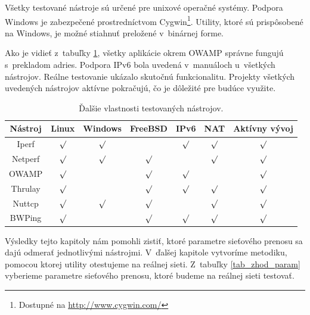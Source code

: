 \newpage 

    Všetky testované nástroje sú určené pre unixové operačné systémy.
    Podpora Windows je zabezpečené
    prostredníctvom Cygwin\footnote{Dostupné na \url{http://www.cygwin.com/}}.
    Utility, ktoré sú prispôsobené na Windows, je možné
    stiahnuť preložené v~binárnej forme. 
    
    Ako je vidieť z~tabuľky
    \ref{tab_zhod_vlast}, všetky aplikácie okrem OWAMP správne fungujú s~prekladom adries. 
    Podpora IPv6 bola uvedená v~manuáloch u~všetkých nástrojov. Reálne 
    testovanie ukázalo skutočnú funkcionalitu. Projekty všetkých uvedených
    nástrojov aktívne pokračujú, čo je dôležité pre budúce využite.

    \begin{table}[h!]
        \begin{center}
            \begin{tabular}{|c|c|c|c|c|c|c|}
                \hline
                \textbf{Nástroj}  &  \textbf{Linux} & \textbf{Windows} &
                \textbf{FreeBSD} & \textbf{IPv6} &  \textbf{NAT} &
                \textbf{Aktívny vývoj}\\ 
                \hline
                Iperf & $\surd$ & $\surd$ &  & $\surd$ & $\surd$ & $\surd$\\
                Netperf & $\surd$ & $\surd$ & $\surd$ &  & $\surd$ & $\surd$\\
                OWAMP & $\surd$ &  & $\surd$ & $\surd$ & & $\surd$\\
                Thrulay & $\surd$ &  & $\surd$ & $\surd$ & $\surd$ & $\surd$\\
                Nuttcp & $\surd$ & $\surd$ & $\surd$ &  & $\surd$ & $\surd$ \\
                BWPing & $\surd$ & & $\surd$ & $\surd$ & $\surd$ & $\surd$\\
                \hline
            \end{tabular}
            \caption{Ďalšie vlastnosti testovaných nástrojov.} 
            \label{tab_zhod_vlast}
        \end{center}
    \end{table}

    Výsledky tejto kapitoly nám pomohli zistiť, ktoré parametre sieťového
    prenosu sa dajú odmerať jednotlivými nástrojmi. V~ďalšej kapitole vytvoríme
    metodiku, pomocou ktorej utility otestujeme na reálnej sieti. Z~tabuľky
    \ref{tab_zhod_param} vyberieme parametre sieťového prenosu, ktoré budeme
    na reálnej sieti testovať.

